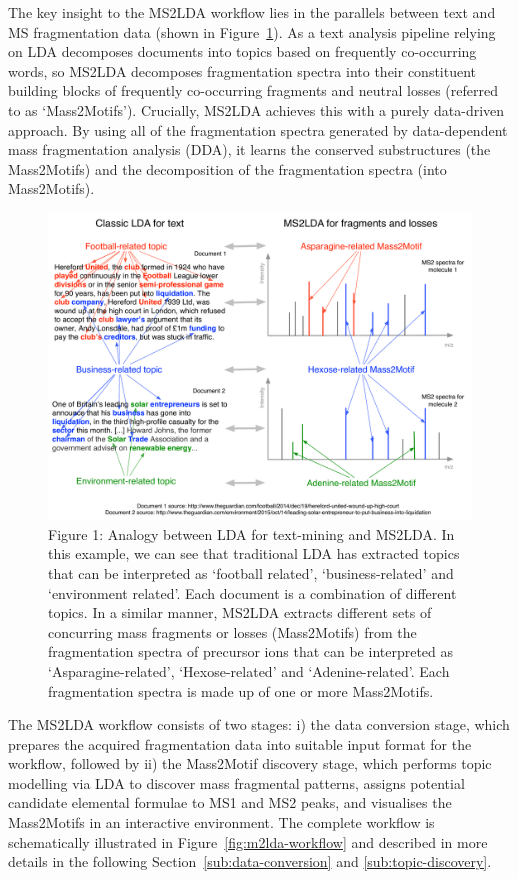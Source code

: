 The key insight to the MS2LDA workflow lies in the parallels between text and MS fragmentation data (shown in Figure~\ref{fig:text2frags}). As a text analysis pipeline relying on LDA decomposes documents into topics based on frequently co-occurring words, so MS2LDA decomposes fragmentation spectra into their constituent building blocks of frequently co-occurring fragments and neutral losses (referred to as ‘Mass2Motifs’). Crucially, MS2LDA achieves this with a purely data-driven approach. By using all of the fragmentation spectra generated by data-dependent mass fragmentation analysis (DDA), it learns the conserved substructures (the Mass2Motifs) and the decomposition of the fragmentation spectra (into Mass2Motifs).  

\begin{figure}[!htbp]
\centering\includegraphics[width=0.7\linewidth]{07-lda/figures/text2frags.pdf}
\centering\caption{Figure 1: Analogy between LDA for text-mining and MS2LDA. In this example, we can see that traditional LDA has extracted topics that can be interpreted as ‘football related’, ‘business-related’ and ‘environment related’. Each document is a combination of different topics. In a similar manner, MS2LDA extracts different sets of concurring mass fragments or losses (Mass2Motifs) from the fragmentation spectra of precursor ions that can be interpreted as ‘Asparagine-related’, ‘Hexose-related’ and ‘Adenine-related’. Each fragmentation spectra is made up of one or more Mass2Motifs.\label{fig:text2frags}}
\end{figure}

The MS2LDA workflow consists of two stages: i) the data conversion stage, which prepares the acquired fragmentation data into suitable input format for the workflow, followed by ii) the Mass2Motif discovery stage, which performs topic modelling via LDA to discover mass fragmental patterns, assigns potential candidate elemental formulae to MS1 and MS2 peaks, and visualises the Mass2Motifs in an interactive environment. The complete workflow is schematically illustrated in Figure~\ref{fig:m2lda-workflow} and described in more details in the following Section~\ref{sub:data-conversion} and \ref{sub:topic-discovery}.

